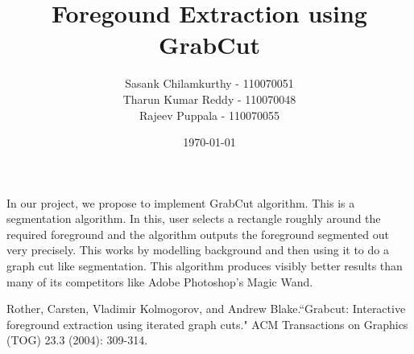 \documentclass[a4paper]{article}
\begin{document}
\title{Foregound Extraction using GrabCut}
\author{Sasank Chilamkurthy - 110070051\\Tharun Kumar Reddy - 110070048\\Rajeev Puppala - 110070055}
\date{\today}
\maketitle

In our project, we propose to implement GrabCut algorithm\cite{main}. This is a segmentation algorithm. 
In this, user selects a rectangle roughly around the required foreground and the algorithm outputs the foreground segmented out very precisely. This works by modelling background and then using it to do a graph cut like segmentation. This algorithm produces visibly better results than many of its competitors like Adobe Photoshop's Magic Wand.

\begin{thebibliography}{4}

  Rother, Carsten, Vladimir Kolmogorov, and Andrew Blake.``Grabcut: Interactive foreground extraction using iterated graph cuts." ACM Transactions on Graphics (TOG) 23.3 (2004): 309-314.
\end{thebibliography}
\end{document}
